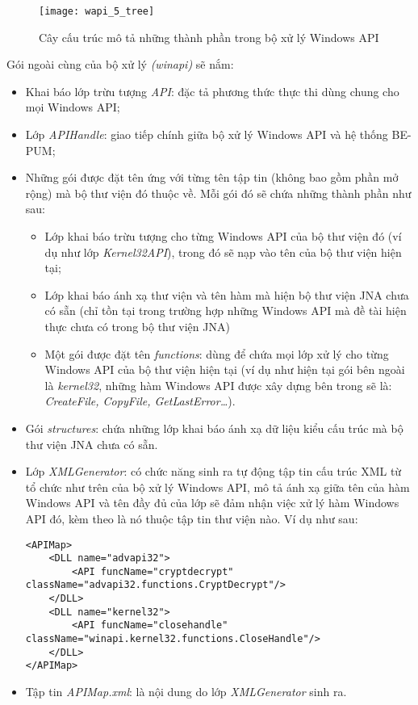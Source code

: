 	\begin{figure}[H]
	\centering
		\texttt{[image: wapi\_5\_tree]}
		\caption{Cây cấu trúc mô tả những thành phần trong bộ xử lý Windows API}	
		\label{fig:wapi_5_tree}		
	\end{figure}

Gói ngoài cùng của bộ xử lý \textit{(winapi)} sẽ nắm:

\begin{itemize}
	\item Khai báo lớp trừu tượng \textit{API}: đặc tả phương thức thực thi dùng chung cho mọi Windows API;

	\item Lớp \textit{APIHandle}: giao tiếp chính giữa bộ xử lý Windows API và hệ thống BE-PUM;

	\item Những gói được đặt tên ứng với từng tên tập tin (không bao gồm phần mở rộng) mà bộ thư viện đó thuộc về. Mỗi gói đó sẽ chứa những thành phần như sau:

	\begin{itemize}
		\item Lớp khai báo trừu tượng cho từng Windows API của bộ thư viện đó (ví dụ như lớp \textit{Kernel32API}), trong đó sẽ nạp vào tên của bộ thư viện hiện tại;

		\item Lớp khai báo ánh xạ thư viện và tên hàm mà hiện bộ thư viện JNA chưa có sẵn (chỉ tồn tại trong trường hợp những Windows API mà đề tài hiện thực chưa có trong bộ thư viện JNA)

		\item Một gói được đặt tên \textit{functions}: dùng để chứa mọi lớp xử lý cho từng Windows API của bộ thư viện hiện tại (ví dụ như hiện tại gói bên ngoài là \textit{kernel32}, những hàm Windows API được xây dựng bên trong sẽ là: \textit{CreateFile, CopyFile, GetLastError…}).
	\end{itemize}

	\item Gói \textit{structures}: chứa những lớp khai báo ánh xạ dữ liệu kiểu cấu trúc mà bộ thư viện JNA chưa có sẵn.

	\item Lớp \textit{XMLGenerator}: có chức năng sinh ra tự động tập tin cấu trúc XML từ tổ chức như trên của bộ xử lý Windows API, mô tả ánh xạ giữa tên của hàm Windows API và tên đầy đủ của lớp sẽ đảm nhận việc xử lý hàm Windows API đó, kèm theo là nó thuộc tập tin thư viện nào. Ví dụ như sau:\\


\lstset{language=HTML}
\begin{lstlisting}
<APIMap>
	<DLL name="advapi32">
		<API funcName="cryptdecrypt" 
className="advapi32.functions.CryptDecrypt"/>
	</DLL>
	<DLL name="kernel32">
		<API funcName="closehandle" 
className="winapi.kernel32.functions.CloseHandle"/>
	</DLL>
</APIMap>
\end{lstlisting}

	\item Tập tin \textit{APIMap.xml}: là nội dung do lớp \textit{XMLGenerator} sinh ra.
\end{itemize}

